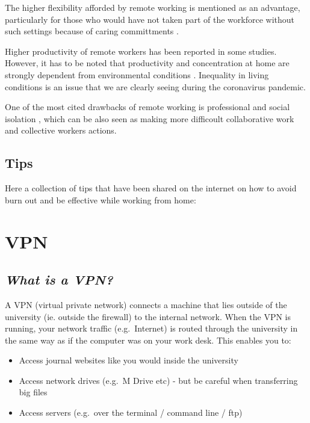 \documentclass[
]{book}
\providecommand{\tightlist}{%
  \setlength{\itemsep}{0pt}\setlength{\parskip}{0pt}}
\begin{document}
The higher flexibility afforded by remote working is mentioned as an advantage, particularly for those who would have not taken part of the workforce without such settings because of caring committments \citep{olson1983remote}.

Higher productivity of remote workers has been reported in some studies. However, it has to be noted that productivity and concentration at home are strongly dependent from environmental conditions \citep{bailey2002review}. Inequality in living conditions is an issue that we are clearly seeing during the coronavirus pandemic.

One of the most cited drawbacks of remote working is professional and social isolation \citep{bailey2002review}, which can be also seen as making more difficoult collaborative work and collective workers actions.

\hypertarget{tips}{%
\section{Tips}\label{tips}}

Here a collection of tips that have been shared on the internet on how to avoid burn out and be effective while working from home:

\hypertarget{vpn}{%
\chapter{VPN}\label{vpn}}

\hypertarget{what-is-a-vpn}{%
\section{\texorpdfstring{\emph{What is a VPN?}}{What is a VPN?}}\label{what-is-a-vpn}}

A VPN (virtual private network) connects a machine that lies outside of the university (ie. outside the firewall) to the internal network. When the VPN is running, your network traffic (e.g.~Internet) is routed through the university in the same way as if the computer was on your work desk. This enables you to:

\begin{itemize}
\tightlist
\item
  Access journal websites like you would inside the university
\item
  Access network drives (e.g.~M Drive etc) - but be careful when transferring big files
\item
  Access servers (e.g.~over the terminal / command line / ftp)
\end{itemize}
\end{document}
